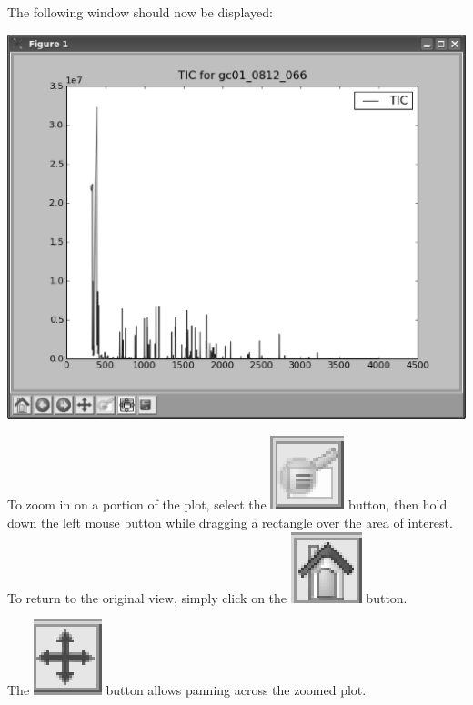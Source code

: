 The following window should now be displayed:

\begin{center}
\includegraphics[scale=0.33]{graphics/test-70a.eps}
\end{center}

To zoom in on a portion of the plot, select the
\includegraphics[scale=0.5]{graphics/magnifier_button.eps}
button, then hold down the 
left mouse button while dragging a rectangle over the area of interest. To return
to the original view, simply click on the
\includegraphics[scale=0.5]{graphics/home_button.eps}
button.

The 
\includegraphics[scale=0.5]{graphics/cross_button.eps}
button allows panning across the zoomed plot. 


